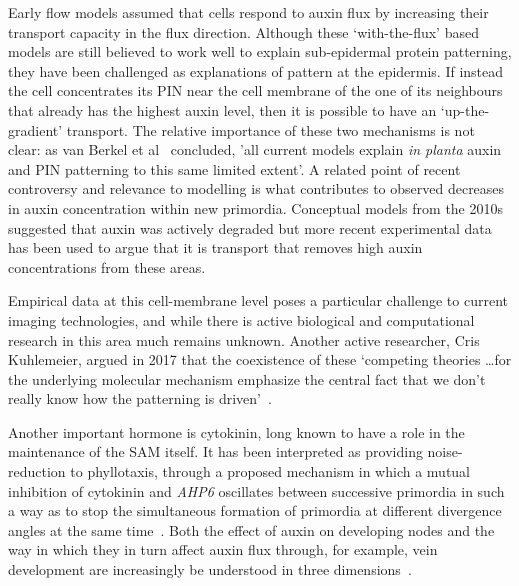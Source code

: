 Early flow models assumed that cells respond to auxin flux by increasing their transport capacity in the flux direction. Although these `with-the-flux' based models are still believed to work well to explain  sub-epidermal protein patterning, they have been challenged as explanations of pattern at the epidermis.  If instead the cell concentrates its PIN near the cell membrane of the one of its neighbours that already has the highest auxin level, then it is possible to 
have an `up-the-gradient' transport. The relative importance of these two mechanisms is  not  clear: as van Berkel et al~\autocite{berkelPolarAuxinTransport2013} concluded, 'all current models explain \textit{in planta} auxin and PIN patterning to this same limited extent'. A related point of recent controversy and relevance to modelling is what contributes to observed decreases in auxin concentration within new primordia. Conceptual models from the 2010s suggested that auxin was actively degraded but more recent experimental data has been used to argue that it is transport that removes high auxin concentrations from these areas.

Empirical data at this cell-membrane level poses a particular challenge  to current imaging technologies, and while there is active biological and computational research in this area much remains unknown. Another active researcher, Cris Kuhlemeier,  argued in 2017 that the coexistence of these `competing theories \ldots  for the underlying molecular mechanism emphasize the central fact that we don't really know how the patterning is driven'~\autocite{kuhlemeierPhyllotaxis2017}. 


Another important hormone is cytokinin, long known to have a role in the maintenance of the SAM itself. It has been interpreted as providing noise-reduction to phyllotaxis, through a proposed mechanism in which a mutual inhibition of cytokinin and \textit{AHP6} oscillates between successive primordia in such a way as to stop the simultaneous formation of primordia at different divergence angles at the same time~\cite{besnardCytokininSignallingInhibitory2014}. Both the effect of auxin on developing nodes and the way in which they in turn affect auxin flux through, for example, vein development are increasingly  be understood in three dimensions~\autocite{debPhyllotaxisInvolvesAuxin2015}.
 
